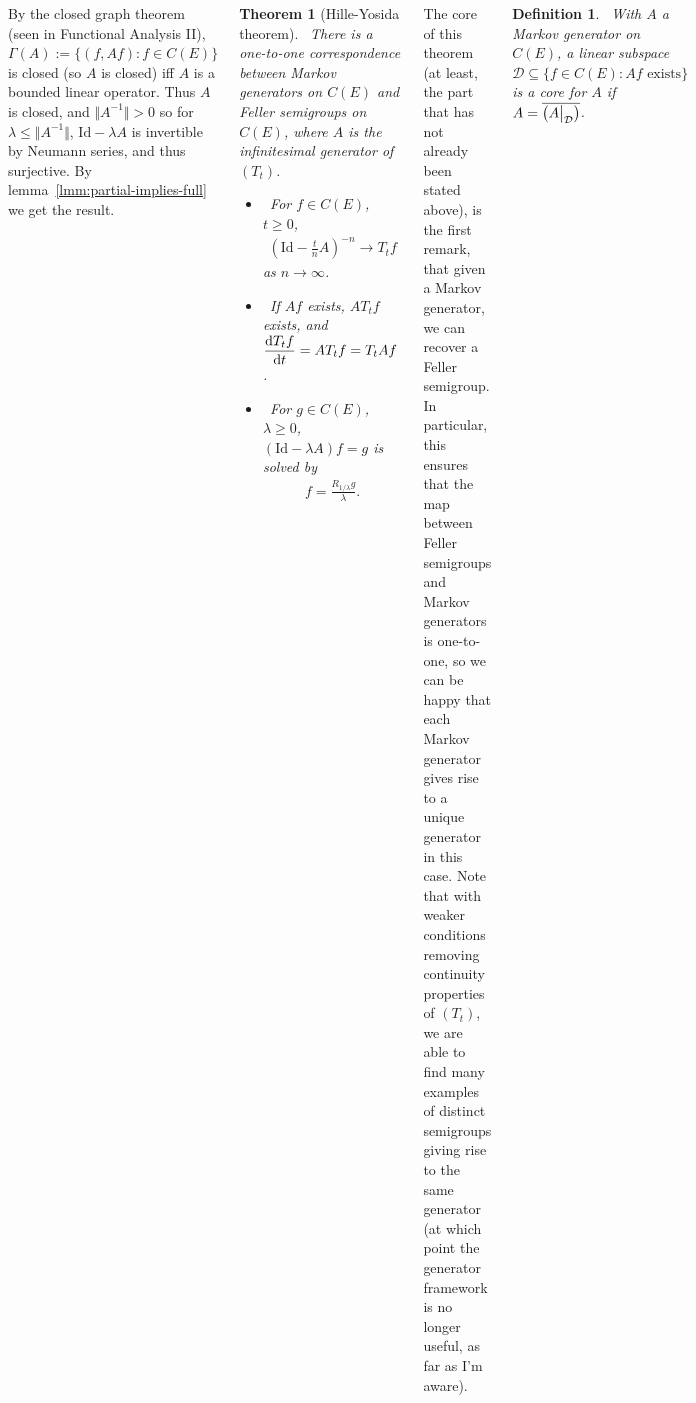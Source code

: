 \documentclass{tikzposter} %
\newcommand{\mc}{\mathcal}
\let\textd\d
\renewcommand{\d}{%
  \ifmmode
    \mathrm{d}%
  \else
    \textd%
  \fi
}
\newcommand\diff[2]{\ensuremath{\frac{\d #1}{\d #2}}}
\newcommand\restr[2]{{%
  \left.\kern-\nulldelimiterspace %
  #1 %
  \vphantom{\big|} %
  \right|_{#2} %
  }}
\newtheorem{theorem}{Theorem}
\newtheorem{definition}{Definition}
\begin{document}
\begin{columns}
{{      By the closed graph theorem (seen in Functional Analysis II), $\Gamma(A) := \{(f, Af) : f \in C(E)\}$ is closed (so $A$ is closed) iff $A$ is a bounded linear operator. Thus $A$ is closed, and $\Vert A^{-1} \Vert > 0$ so for $\lambda \le \Vert A^{-1} \Vert$, $\mathrm{Id} - \lambda A$ is invertible by Neumann series, and thus surjective. By lemma~\ref{lmm:partial-implies-full} we get the result.  \\
      

      \begin{theorem}[Hille-Yosida theorem]
    \ There is a one-to-one correspondence between Markov generators on $C(E)$ and Feller semigroups on $C(E)$, where $A$ is the infinitesimal generator of $(T_t)$.
    \begin{itemize}[label=$\cdot$]
      \item \ For $f \in C(E)$, $t \ge 0$,
            \begin{align*}
              \left(\mathrm{Id} - \frac{t}{n}A\right)^{-n} \to T_t f
            \end{align*}
            as $n \to \infty$.
        \item \ If $Af$ exists, $AT_t f$ exists, and $\displaystyle \diff{T_t f}{t} = AT_t f = T_t A f$.
            \item \ For $g \in C(E)$, $\lambda \ge 0$, $(\mathrm{Id} - \lambda A) f = g$ is solved by
            \begin{align*}
              f = \frac{R_{1/\lambda}g}{\lambda}.
            \end{align*}
    \end{itemize}
      \end{theorem}
      \hphantom{}

      The core of this theorem (at least, the part that has not already been stated above), is the first remark, that given a Markov generator, we can recover a Feller semigroup. In particular, this ensures that the map between Feller semigroups and Markov generators is one-to-one, so we can be happy that each Markov generator gives rise to a unique generator in this case. Note that with weaker conditions removing continuity properties of $(T_t)$, we are able to find many examples of distinct semigroups giving rise to the same generator (at which point the generator framework is no longer useful, as far as I'm aware). \\

      \begin{definition}
    \ With $A$ a Markov generator on $C(E)$, a linear subspace $\mc{D} \subseteq \{f \in C(E) : Af \!\text{ exists}\}$ is a core for $A$ if $A = \overline{\left(\restr{A}{\mc{D}}\right)}$.
      \end{definition}
      \hphantom{}

}}
\end{columns}
\end{document}
